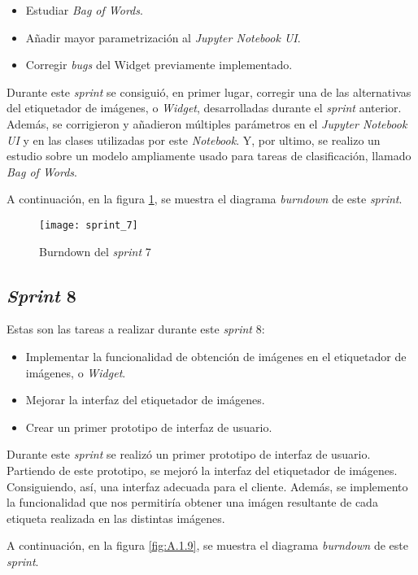 \begin{itemize}
	\item Estudiar \textit{Bag of Words}.
	\item Añadir mayor parametrización al \textit{Jupyter Notebook UI}.
	\item Corregir \textit{bugs} del Widget previamente implementado.
\end{itemize}

Durante este \textit{sprint} se consiguió, en primer lugar, corregir una de las alternativas del etiquetador de imágenes, o \textit{Widget}, desarrolladas durante el \textit{sprint} anterior. Además, se corrigieron y añadieron múltiples parámetros en el \textit{Jupyter Notebook UI} y en las clases utilizadas por este \textit{Notebook}. Y, por ultimo, se realizo un estudio sobre un modelo ampliamente usado para tareas de clasificación, llamado \textit{Bag of Words}.

A continuación, en la figura \ref{fig:A.1.8}, se muestra el diagrama \textit{burndown} de este \textit{sprint}.

\begin{figure}[h]
\centering
\texttt{[image: sprint\_7]}
\caption{Burndown del \textit{sprint} 7}
\label{fig:A.1.8}
\end{figure}


\subsection{\textit{Sprint} 8}
Estas son las tareas a realizar durante este \textit{sprint} 8:

\begin{itemize}
	\item Implementar la funcionalidad de obtención de imágenes en el etiquetador de imágenes, o \textit{Widget}.
	\item Mejorar la interfaz del etiquetador de imágenes.
	\item Crear un primer prototipo de interfaz de usuario.
\end{itemize}

Durante este \textit{sprint} se realizó un primer prototipo de interfaz de  usuario. Partiendo de este prototipo, se mejoró la interfaz del etiquetador de imágenes. Consiguiendo, así, una interfaz adecuada para el cliente. Además, se implemento la funcionalidad que nos permitiría obtener una imágen resultante de cada etiqueta realizada en las distintas imágenes.

A continuación, en la figura \ref{fig:A.1.9}, se muestra el diagrama \textit{burndown} de este \textit{sprint}.

